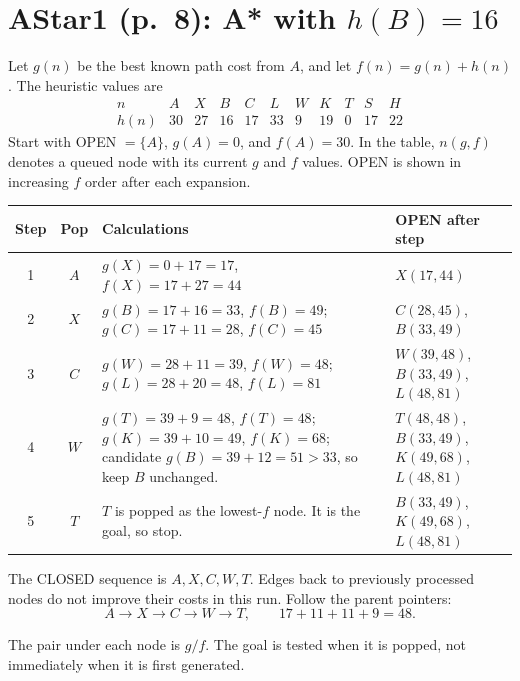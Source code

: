 \documentclass[11pt,a4paper]{article}
\newcommand{\question}[2]{\section*{#1: #2}}
\begin{document}
\newpage
\question{AStar1 (p.\ 8)}{A* with $h(B)=16$}
Let $g(n)$ be the best known path cost from $A$, and let $f(n)=g(n)+h(n)$. The heuristic values are
\[
\begin{array}{c|rrrrrrrrrr}
n&A&X&B&C&L&W&K&T&S&H\\\hline
h(n)&30&27&16&17&33&9&19&0&17&22
\end{array}
\]
Start with OPEN $=\{A\}$, $g(A)=0$, and $f(A)=30$. In the table, $n(g,f)$ denotes a queued node with its current $g$ and $f$ values. OPEN is shown in increasing $f$ order after each expansion.
\begin{center}\small\begin{tabular}{c|c|>{\raggedright\arraybackslash}p{6.4cm}|>{\raggedright\arraybackslash}p{4.4cm}}\toprule
Step&Pop&Calculations&OPEN after step\\\midrule
1&$A$&$g(X)=0+17=17$, $f(X)=17+27=44$&$X(17,44)$\\
2&$X$&$g(B)=17+16=33$, $f(B)=49$; $g(C)=17+11=28$, $f(C)=45$&$C(28,45)$, $B(33,49)$\\
3&$C$&$g(W)=28+11=39$, $f(W)=48$; $g(L)=28+20=48$, $f(L)=81$&$W(39,48)$, $B(33,49)$, $L(48,81)$\\
4&$W$&$g(T)=39+9=48$, $f(T)=48$; $g(K)=39+10=49$, $f(K)=68$; candidate $g(B)=39+12=51>33$, so keep $B$ unchanged.&$T(48,48)$, $B(33,49)$, $K(49,68)$, $L(48,81)$\\
5&$T$&$T$ is popped as the lowest-$f$ node. It is the goal, so stop.&$B(33,49)$, $K(49,68)$, $L(48,81)$\\\bottomrule\end{tabular}\normalsize\end{center}
The CLOSED sequence is $A,X,C,W,T$. Edges back to previously processed nodes do not improve their costs in this run. Follow the parent pointers:
\[
\boxed{A\to X\to C\to W\to T},\qquad
\boxed{17+11+11+9=48}.
\]
\begin{center}\end{center}
The pair under each node is $g/f$. The goal is tested when it is popped, not immediately when it is first generated.
\end{document}
